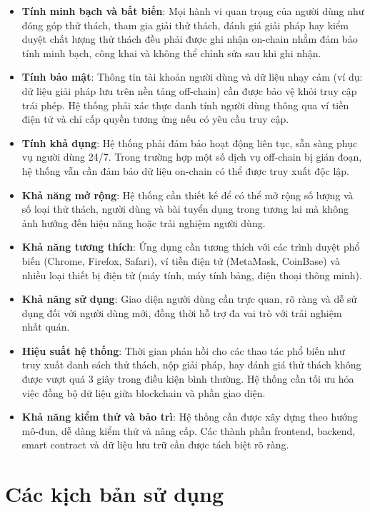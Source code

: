 \begin{itemize}
  \item \textbf{Tính minh bạch và bất biến}: Mọi hành vi quan trọng của người dùng như đóng góp thử thách, tham gia giải thử thách, đánh giá giải pháp hay kiểm duyệt chất lượng thử thách đều phải được ghi nhận on-chain nhằm đảm bảo tính minh bạch, công khai và không thể chỉnh sửa sau khi ghi nhận.
  \item \textbf{Tính bảo mật}: Thông tin tài khoản người dùng và dữ liệu nhạy cảm (ví dụ: dữ liệu giải pháp lưu trên nền tảng off-chain) cần được bảo vệ khỏi truy cập trái phép. Hệ thống phải xác thực danh tính người dùng thông qua ví tiền điện tử và chỉ cấp quyền tương ứng nếu có yêu cầu truy cập.
  \item \textbf{Tính khả dụng}: Hệ thống phải đảm bảo hoạt động liên tục, sẵn sàng phục vụ người dùng 24/7. Trong trường hợp một số dịch vụ off-chain bị gián đoạn, hệ thống vẫn cần đảm bảo dữ liệu on-chain có thể được truy xuất độc lập.
  \item \textbf{Khả năng mở rộng}: Hệ thống cần thiết kế để có thể mở rộng số lượng và số loại thử thách, người dùng và bài tuyển dụng trong tương lai mà không ảnh hưởng đến hiệu năng hoặc trải nghiệm người dùng.
  \item \textbf{Khả năng tương thích}: Ứng dụng cần tương thích với các trình duyệt phổ biến (Chrome, Firefox, Safari), ví tiền điện tử (MetaMask, CoinBase) và nhiều loại thiết bị điện tử (máy tính, máy tính bảng, điện thoại thông minh).
  \item \textbf{Khả năng sử dụng}: Giao diện người dùng cần trực quan, rõ ràng và dễ sử dụng đối với người dùng mới, đồng thời hỗ trợ đa vai trò với trải nghiệm nhất quán.
  \item \textbf{Hiệu suất hệ thống}: Thời gian phản hồi cho các thao tác phổ biến như truy xuất danh sách thử thách, nộp giải pháp, hay đánh giá thử thách không được vượt quá 3 giây trong điều kiện bình thường. Hệ thống cần tối ưu hóa việc đồng bộ dữ liệu giữa blockchain và phần giao diện.
  \item \textbf{Khả năng kiểm thử và bảo trì}: Hệ thống cần được xây dựng theo hướng mô-đun, dễ dàng kiểm thử và nâng cấp. Các thành phần frontend, backend, smart contract và dữ liệu lưu trữ cần được tách biệt rõ ràng.
\end{itemize}

\section{Các kịch bản sử dụng}

